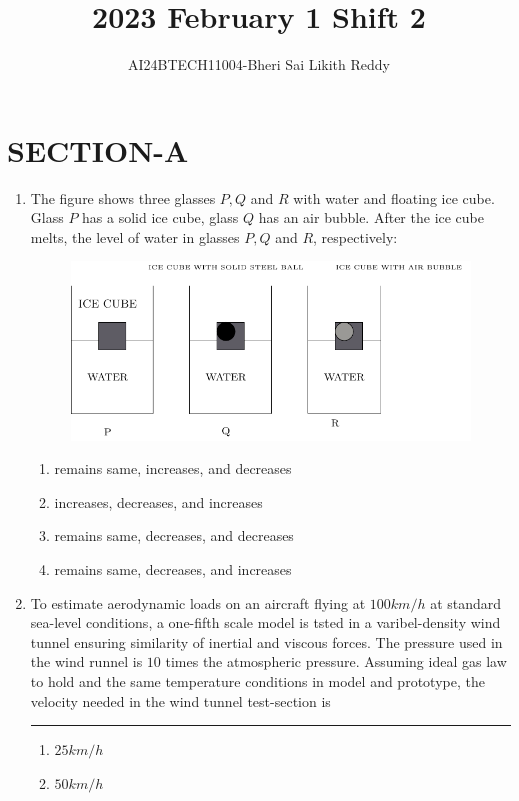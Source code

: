 \documentclass[journal]{IEEEtran}
\begin{document}

\onecolumn
\newpage
\title{2023 February 1 Shift 2}
\author{AI24BTECH11004-Bheri Sai Likith Reddy}
\maketitle
\section{SECTION-A}

\begin{enumerate}
       \item The figure shows three glasses $P,Q$ and $R$ with water and floating ice cube. Glass $P$ has a solid ice cube, glass $Q$ has an air bubble. After the ice cube melts, the level of water in glasses $P,Q$ and $R$, respectively:
      \begin{figure}[ht!]
	    \centering
	    \includegraphics[width=0.5\linewidth]{fig/fig1.pdf}
	\end{figure}
       \begin{enumerate}
           \item remains same, increases, and decreases
           \item increases, decreases, and increases
           \item remains same, decreases, and decreases
           \item remains same, decreases, and increases
       \end{enumerate}
       \item To estimate aerodynamic loads on an aircraft flying at $100km/h$ at standard sea-level conditions, a one-fifth scale model is tsted in a varibel-density wind tunnel ensuring similarity of inertial and viscous forces. The pressure used in the wind runnel is $10$ times the atmospheric pressure. Assuming ideal gas law to hold and the same temperature conditions in model and prototype, the velocity needed in the wind tunnel test-section is \rule{1cm}{0.15mm}
       \begin{enumerate}
           \item $25km/h$
           \item $50km/h$

\end{enumerate}
\end{enumerate}
\end{document}
